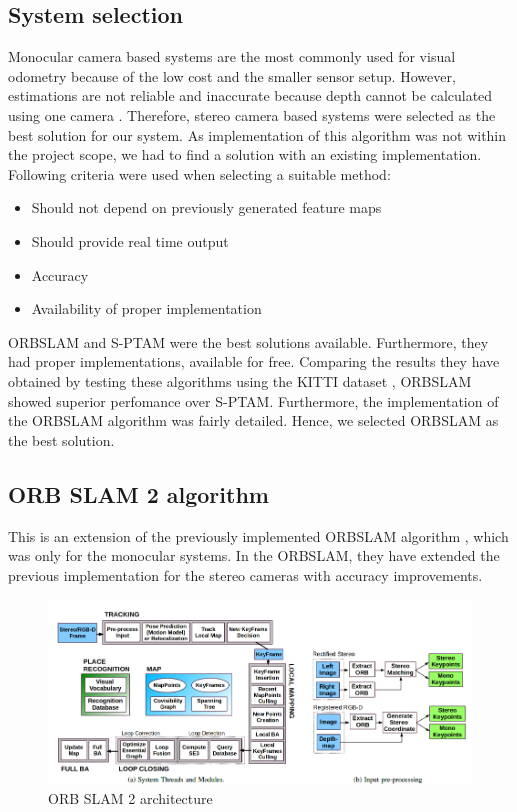 \subsection{System selection}
\label{subsec:vodomSystemSelection}
Monocular camera based systems are the most commonly used for visual odometry because of the low cost and the smaller sensor setup. However, estimations are not reliable and inaccurate because depth cannot be calculated using one camera \cite{ra:ORB_SLAM2}. Therefore, stereo camera based systems were selected as the best solution for our system. As implementation of this algorithm was not within the project scope, we had to find a solution with an existing implementation. Following criteria were used when selecting a suitable method:
\begin{itemize}
    \item Should not depend on previously generated feature maps
    \item Should provide real time output
    \item Accuracy
    \item Availability of proper implementation
\end{itemize}

\gls{ORBSLAM} \cite{ra:ORB_SLAM2} and \gls{S-PTAM} \cite{ra:S-PTAM} were the best solutions available. Furthermore, they had proper implementations, available for free. Comparing the results they have obtained by testing these algorithms using the KITTI dataset \cite{ra:KITTI}, \gls{ORBSLAM} showed superior perfomance over \gls{S-PTAM}. Furthermore, the implementation of the \gls{ORBSLAM} algorithm was fairly detailed. Hence, we selected \gls{ORBSLAM} as the best solution.


\subsection{ORB SLAM 2 algorithm}
This is an extension of the previously implemented \gls{ORBSLAM} algorithm \cite{ra:ORB_SLAM}, which was only for the monocular systems. In the \gls{ORBSLAM}, they have extended the previous implementation for the stereo cameras with accuracy improvements\cite{ra:ORB_SLAM2}. 
\begin{figure}[t]
	\centering
	\includegraphics[width=\textwidth]{figs/ORB_SYSTEM.png}
	\vspace{-0.5cm}
	\caption[ORB SLAM 2 architecture]{ORB SLAM 2 architecture \cite{ra:ORB_SLAM2}}
	\label{fig:ra:ORB_SYSTEM}
	\vspace{0.5cm}
\end{figure}

